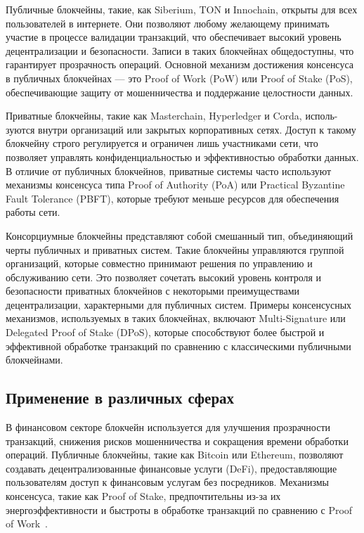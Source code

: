 \documentclass{mirea-article}
\begin{document}
Публичные блокчейны, такие, как Siberium, TON и Innochain, открыты для всех пользователей в интернете. Они позволяют любому желающему принимать участие в процессе валидации транзакций, что обеспечивает высокий уровень децентрализации и безопасности. Записи в таких блокчейнах общедоступны, что гарантирует прозрачность операций. Основной механизм достижения консенсуса в публичных блокчейнах --- это Proof of Work (PoW) или Proof of Stake (PoS), обеспечивающие защиту от мошенничества и поддержание целостности данных.

Приватные блокчейны, такие как Masterchain, Hyperledger и Corda, исполь-зуются внутри организаций или закрытых корпоративных сетях. Доступ к такому блокчейну строго регулируется и ограничен лишь участниками сети, что позволяет управлять конфиденциальностью и эффективностью обработки данных. В отличие от публичных блокчейнов, приватные системы часто используют механизмы консенсуса типа Proof of Authority (PoA) или Practical Byzantine Fault Tolerance (PBFT), которые требуют меньше ресурсов для обеспечения работы сети.

Консорциумные блокчейны представляют собой смешанный тип, объединяющий черты публичных и приватных систем. Такие блокчейны управляются группой организаций, которые совместно принимают решения по управлению и обслуживанию сети. Это позволяет сочетать высокий уровень контроля и безопасности приватных блокчейнов с некоторыми преимуществами децентрализации, характерными для публичных систем. Примеры консенсусных механизмов, используемых в таких блокчейнах, включают Multi-Signature или Delegated Proof of Stake (DPoS), которые способствуют более быстрой и эффективной обработке транзакций по сравнению с классическими публичными блокчейнами.

\subsection*{Применение в различных сферах}

В финансовом секторе блокчейн используется для улучшения прозрачности транзакций, снижения рисков мошенничества и сокращения времени обработки операций. Публичные блокчейны, такие как Bitcoin или Ethereum, позволяют создавать децентрализованные финансовые услуги (DeFi), предоставляющие пользователям доступ к финансовым услугам без посредников. Механизмы консенсуса, такие как Proof of Stake, предпочтительны из-за их энергоэффективности и быстроты в обработке транзакций по сравнению с Proof of Work~\cite{bib:blckis}.
\end{document}
